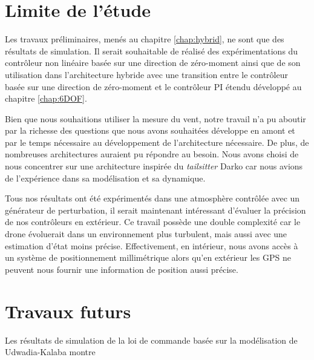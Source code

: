 {\section{Limite de l'étude}
Les travaux préliminaires, menés au chapitre \ref{chap:hybrid}, ne sont que des résultats de simulation. Il serait souhaitable de réalisé des expérimentations du contrôleur non linéaire basée sur une direction de zéro-moment ainsi que de son utilisation dans l'architecture hybride avec une transition entre le contrôleur basée sur une direction de zéro-moment et le contrôleur PI étendu développé au chapitre \ref{chap:6DOF}.

Bien que nous souhaitions utiliser la mesure du vent, notre travail n'a pu aboutir par la richesse des questions que nous avons souhaitées développe en amont et par le temps nécessaire au développement de l'architecture nécessaire.
De plus, de nombreuses architectures auraient pu répondre au besoin. Nous avons choisi de nous concentrer sur une architecture inspirée du \textit{tailsitter} Darko car nous avions de l'expérience dans sa modélisation et sa dynamique.

Tous nos résultats ont été expérimentés dans une atmosphère contrôlée avec un générateur de perturbation, il serait maintenant intéressant d'évaluer la précision de nos contrôleurs en extérieur. Ce travail possède une double complexité car le drone évoluerait dans un environnement plus turbulent, mais aussi avec une estimation d'état moins précise. Effectivement, en intérieur, nous avons accès à un système de positionnement millimétrique alors qu'en extérieur les GPS ne peuvent nous fournir une information de position aussi précise.


\section{Travaux futurs}

Les résultats de simulation de la loi de commande basée sur la modélisation de Udwadia-Kalaba montre 

}